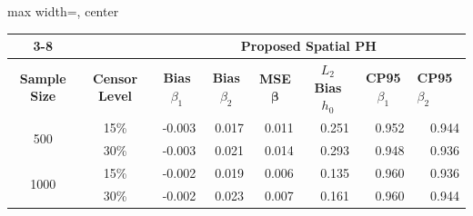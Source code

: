 \documentclass[11pt]{article}
\begin{document}
\begin{table}[h]
\begingroup  %
\renewcommand{\arraystretch}{1.0}  %
\setlength{\arrayrulewidth}{0.4pt}  %
\centering
\setlength{\tabcolsep}{3.5pt}
\footnotesize
\begin{adjustbox}{max width=\textwidth, center}
\begin{tabular}{cc|rrrrll}
\cline{3-8}
\multicolumn{1}{l}{}                        & \multicolumn{1}{l|}{} & \multicolumn{6}{c|}{\textbf{Proposed Spatial PH}}                                                                                                                                                                                                                                         \\ \hline
\multicolumn{1}{|c|}{\textbf{Sample Size}}  & \textbf{Censor Level} & \multicolumn{1}{c|}{\textbf{Bias $\beta_1$}} & \multicolumn{1}{c|}{\textbf{Bias $\beta_2$}} & \multicolumn{1}{c|}{\textbf{MSE $\bm\beta$}} & \multicolumn{1}{c|}{\textbf{$L_2$ Bias $h_0$}} & \multicolumn{1}{c|}{\textbf{CP95 $\beta_1$}} & \multicolumn{1}{l|}{\textbf{CP95 $\beta_2$}} \\ \hline
\multicolumn{1}{|c|}{\multirow{2}{*}{500}}  & 15\%                  & \multicolumn{1}{r|}{-0.003}                  & \multicolumn{1}{r|}{0.017}                   & \multicolumn{1}{r|}{0.011}                   & \multicolumn{1}{r|}{0.251}                     & \multicolumn{1}{r|}{0.952}                   & \multicolumn{1}{r|}{0.944}                   \\ \cline{2-8} 
\multicolumn{1}{|c|}{}                      & 30\%                  & \multicolumn{1}{r|}{-0.003}                  & \multicolumn{1}{r|}{0.021}                   & \multicolumn{1}{r|}{0.014}                   & \multicolumn{1}{r|}{0.293}                     & \multicolumn{1}{r|}{0.948}                   & \multicolumn{1}{r|}{0.936}                   \\ \hline
\multicolumn{1}{|c|}{\multirow{2}{*}{1000}} & 15\%                  & \multicolumn{1}{r|}{-0.002}                  & \multicolumn{1}{r|}{0.019}                   & \multicolumn{1}{r|}{0.006}                   & \multicolumn{1}{r|}{0.135}                     & \multicolumn{1}{r|}{0.960}                   & \multicolumn{1}{r|}{0.936}                   \\ \cline{2-8} 
\multicolumn{1}{|c|}{}                      & 30\%                  & \multicolumn{1}{r|}{-0.002}                  & \multicolumn{1}{r|}{0.023}                   & \multicolumn{1}{r|}{0.007}                   & \multicolumn{1}{r|}{0.161}                     & \multicolumn{1}{r|}{0.960}                   & \multicolumn{1}{r|}{0.944}                   \\ \hline

\end{tabular}
\end{adjustbox}
\end{table}
\end{document}

